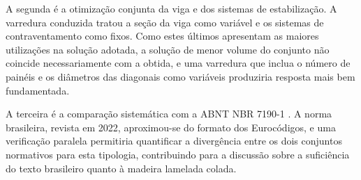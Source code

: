 A segunda é a otimização conjunta da viga e dos sistemas de estabilização. A
varredura conduzida tratou a seção da viga como variável e os sistemas de
contraventamento como fixos. Como estes últimos apresentam as maiores
utilizações na solução adotada, a solução de menor volume do conjunto não
coincide necessariamente com a obtida, e uma
varredura que inclua o número de painéis e os diâmetros das diagonais como
variáveis produziria resposta mais bem fundamentada.

A terceira é a comparação sistemática com a ABNT NBR 7190-1
\cite{NBR7190-1:2022}. A norma brasileira, revista em 2022, aproximou-se do
formato dos Eurocódigos, e uma verificação paralela permitiria quantificar a
divergência entre os dois conjuntos normativos para esta tipologia, contribuindo
para a discussão sobre a suficiência do texto brasileiro quanto à madeira
lamelada colada.
